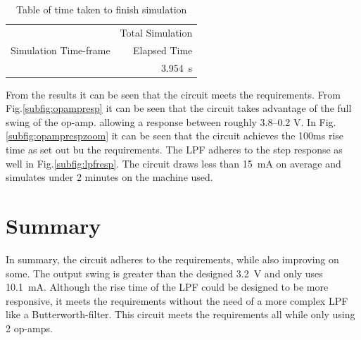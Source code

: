 \begin{table}[H]
    \centering
    \footnotesize
    \captionsetup{justification=centering}
    \caption{Table of time taken to finish simulation \\}
    \begin{tabular}{c@{\qquad}r}
    \toprule
         \multirow{3}{*}{Simulation Time-frame} & Total Simulation\\
         & Elapsed Time \\
    \midrule
         \SI{500}{\milli\second} & \SI{3.954}{\second}\\
    \bottomrule
    \end{tabular}
    \label{tab:sim_time}
\end{table}
\par
From the results it can be seen that the circuit meets the requirements. From Fig.\ref{subfig:opampresp} it can be seen that the circuit takes advantage of the full swing of the op-amp. allowing a response between roughly \numrange{3.8}{0.2} \si{\volt}. In Fig.\ref{subfig:opamprespzoom} it can be seen that the circuit achieves the 100ms rise time as set out bu the requirements. The LPF adheres to the step response as well in Fig.\ref{subfig:lpfresp}. The circuit draws less than \SI{15}{\milli\ampere} on average and simulates under 2 minutes on the machine used.
\section{Summary}\label{sec:temp_summary_ch3}
In summary, the circuit adheres to the requirements, while also improving on some. The output swing is greater than the designed \SI{3.2}{\volt} and only uses \SI{10.1}{\milli\ampere}. Although the rise time of the LPF could be designed to be more responsive, it meets the requirements without the need of a more complex LPF like a Butterworth-filter. This circuit meets the requirements all while only using 2 op-amps.


